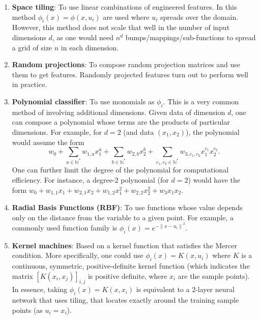 \begin{enumerate}
    \item \textbf{Space tiling}: To use linear combinations of engineered features.
    In this method $\phi_i(x) = \phi(x,u_i)$ are used where $u_i$ spreads over the domain.
    However, this method does not scale that well in the number of input dimensions $d$, as one would need $n^d$ bumps/mappings/sub-functions to spread a grid of size $n$ in each dimension.

    \item \textbf{Random projections}: To compose random projection matrices and use them to get features.
    Randomly projected features turn out to perform well in practice.

    \item \textbf{Polynomial classifier}: To use monomials as $\phi_i$.
    This is a very common method of involving additional dimensions.
    Given data of dimension $d$, one can compose a polynomial whose terms are the products of particular dimensions.
    For example, for $d = 2$ (and data $(x_1, x_2)$), the polynomial would assume the form
    \begin{equation*}
        w_0 + \sum_{a \in \mathbb{N}^*} w_{1, a} x_1^a + \sum_{b \in \mathbb{N}^*} w_{2, b} x_2^b + \sum_{c_1, c_2 \in \mathbb{N}^*} w_{3, c_1, c_2} x_1^{c_1} x_2^{c_2}
        \text{.}
    \end{equation*}
    One can further limit the degree of the polynomial for computational efficiency.
    For instance, a degree-2 polynomial (for $d = 2$) would have the form $w_0 + w_{1, 1} x_1 + w_{2, 1} x_2 + w_{1, 2} x_1^2 + w_{2, 2} x_2^2 + w_3 x_1 x_2$.

    \item \textbf{Radial Basis Functions (RBF)}: To use functions whose value depends only on the distance from the variable to a given point.
    For example, a commonly used function family is $\phi_i(x)=e^{-{\|x-u_i\|}^2}$.

    \item \textbf{Kernel machines}: Based on a kernel function that satisfies the Mercer condition.
    More specifically, one could use $\phi_i(x) = K(x, u_i)$ where $K$ is a continuous, symmetric, positive-definite kernel function (which indicates the matrix $[K(x_i, x_j)]_{i, j}$ is positive definite, where $x_i$ are the sample points).
    In essence, taking $\phi_i(x) = K(x, x_i)$ is equivalent to a 2-layer neural network that uses tiling, that locates exactly around the training sample points (as $u_i = x_i$).
\end{enumerate}

